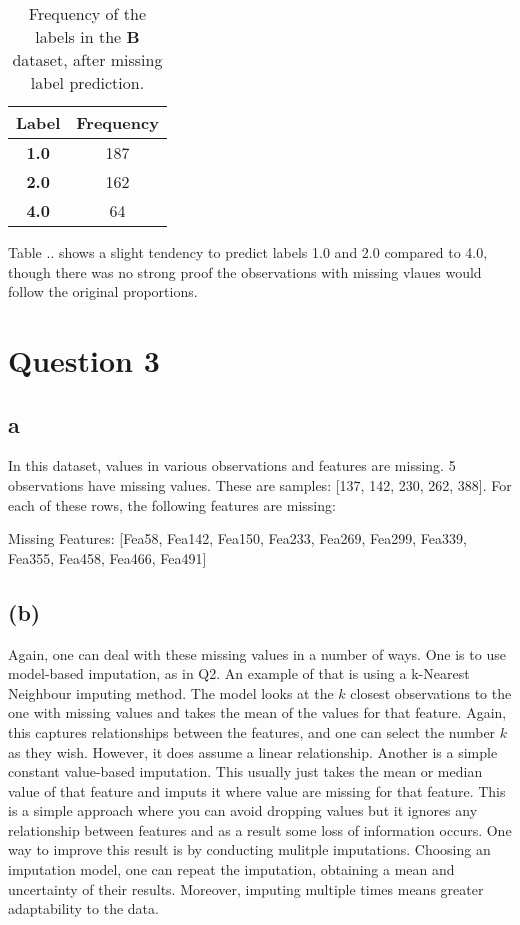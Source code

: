\documentclass[12pt]{report} %
\begin{document}
\begin{table}[h]
    \centering
    \begin{tabular}{ |c|c| }
        \hline
        \textbf{Label} & \textbf{Frequency} \\
        \hline
        \textbf{1.0} & 187 \\ 
        \hline
        \textbf{2.0} & 162 \\
        \hline
        \textbf{4.0} & 64 \\
        \hline
    \end{tabular}
    \caption{Frequency of the labels in the \textbf{B} dataset, after missing label prediction.}
    \end{table}

Table .. shows a slight tendency to predict labels 1.0 and 2.0 compared to 4.0, though there was no strong proof the observations with missing vlaues would follow the original proportions.

\section*{Question 3}

\subsection*{a}

In this dataset, values in various observations and features are missing. 5 observations have missing values. These are samples: [137, 142, 230, 262, 388]. For each of these rows, the following features are missing:

\begin{center}
    Missing Features: [Fea58, Fea142, Fea150, Fea233, Fea269, Fea299, Fea339, Fea355, Fea458, Fea466, Fea491]
\end{center}

\subsection*{(b)}

Again, one can deal with these missing values in a number of ways.  
One is to use model-based imputation, as in Q2. An example of that is using a k-Nearest Neighbour imputing method. The model looks at the $k$ closest observations to the one with missing values and takes the mean of the values for that feature. Again, this captures relationships between the features, and one can select the number $k$ as they wish. However, it does assume a linear relationship.  
Another is a simple constant value-based imputation. This usually just takes the mean or median value of that feature and imputs it where value are missing for that feature. This is a simple approach where you can avoid dropping values but it ignores any relationship between features and as a result some loss of information occurs.  
One way to improve this result is by conducting mulitple imputations. Choosing an imputation model, one can repeat the imputation, obtaining a mean and uncertainty of their results. Moreover, imputing multiple times means greater adaptability to the data.



\end{document}
